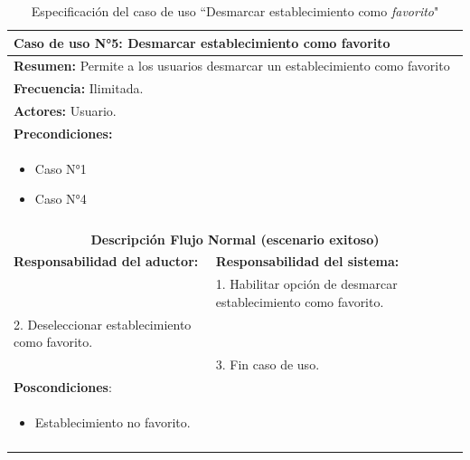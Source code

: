 \begin{table}[H]
    \centering
    \caption{Especificaci\'on del caso de uso ``Desmarcar establecimiento como \textit{favorito}"}
    \begin{tabularx}{\textwidth}{|X|X|}
        \hline
        \multicolumn{2}{|l|}{\textbf{Caso de uso N°5:} Desmarcar establecimiento como favorito}\\\hline
        \multicolumn{2}{|l|}{\textbf{Resumen:} Permite a los usuarios desmarcar un establecimiento como favorito}\\\hline
        \multicolumn{2}{|l|}{\textbf{Frecuencia:} Ilimitada.}\\\hline
        \multicolumn{2}{|l|}{\textbf{Actores:} Usuario.}\\\hline
        \multicolumn{2}{|l|}{\textbf{Precondiciones:}}\\
        \multicolumn{2}{|l|}{\begin{minipage}[t]{0.8\textwidth}
        \begin{itemize}
            \item Caso N°1
            \item Caso N°4
        \end{itemize}
        \end{minipage}}\\
        \multicolumn{2}{|l|}{}\\\hline
        \multicolumn{2}{|c|}{\textbf{Descripci\'on Flujo Normal (escenario exitoso)}}\\\hline
        \textbf{Responsabilidad del aductor:} & \textbf{Responsabilidad del sistema:}\\ \hline
        &1. Habilitar opción de desmarcar establecimiento como favorito.\\
        2. Deseleccionar establecimiento como favorito.&\\
        &3. Fin caso de uso.\\\hline
        \multicolumn{2}{|l|}{\textbf{Poscondiciones}:}\\
        \multicolumn{2}{|l|}{\begin{minipage}[t]{0,4\textwidth}
        \begin{itemize}
            \item Establecimiento no favorito.
        \end{itemize}
        \end{minipage}}\\
        \multicolumn{2}{|l|}{}\\\hline        
    \end{tabularx}
    \label{usecase5}
\end{table}


